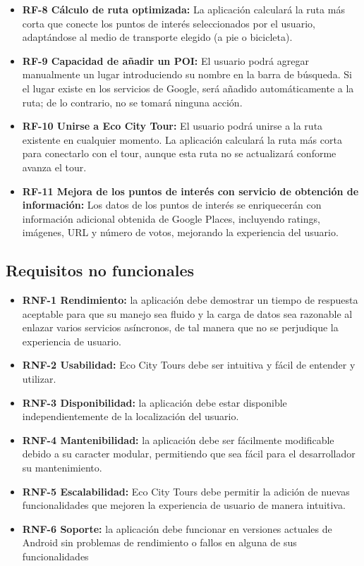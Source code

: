 \begin{itemize}
	\item \textbf{RF-8 Cálculo de ruta optimizada:} La aplicación calculará la ruta más corta que conecte los puntos de interés seleccionados por el usuario, adaptándose al medio de transporte elegido (a pie o bicicleta).
	
	\item \textbf{RF-9 Capacidad de añadir un POI:} El usuario podrá agregar manualmente un lugar introduciendo su nombre en la barra de búsqueda. Si el lugar existe en los servicios de Google, será añadido automáticamente a la ruta; de lo contrario, no se tomará ninguna acción.
	
	\item \textbf{RF-10 Unirse a Eco City Tour:} El usuario podrá unirse a la ruta existente en cualquier momento. La aplicación calculará la ruta más corta para conectarlo con el tour, aunque esta ruta no se actualizará conforme avanza el tour.
	
	\item \textbf{RF-11 Mejora de los puntos de interés con servicio de obtención de información:} Los datos de los puntos de interés se enriquecerán con información adicional obtenida de Google Places, incluyendo ratings, imágenes, URL y número de votos, mejorando la experiencia del usuario.
\end{itemize}

\subsection{Requisitos no funcionales}
\begin{itemize}
	\item \textbf{RNF-1 Rendimiento:} la aplicación debe demostrar un tiempo de respuesta aceptable para que su manejo sea fluido y la carga de datos sea razonable al enlazar varios servicios asíncronos, de tal manera que no se perjudique la experiencia de usuario. 
	\item \textbf{RNF-2 Usabilidad:} Eco City Tours debe ser intuitiva y fácil de entender y utilizar.
	\item \textbf{RNF-3 Disponibilidad:} la aplicación debe estar disponible independientemente de la localización del usuario.
	\item \textbf{RNF-4 Mantenibilidad:} la aplicación debe ser fácilmente modificable debido a su caracter modular, permitiendo que sea fácil para el desarrollador su mantenimiento.
	\item \textbf{RNF-5 Escalabilidad:} Eco City Tours debe permitir la adición de nuevas funcionalidades que mejoren la experiencia de usuario de manera intuitiva.
	\item \textbf{RNF-6 Soporte:} la aplicación debe funcionar en versiones actuales de Android sin problemas de rendimiento o fallos en alguna de sus funcionalidades
\end{itemize}
